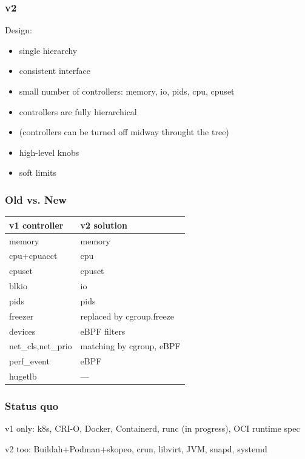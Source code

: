 \documentclass[serif]{beamer}
\begin{document}
\begin{frame}
  \frametitle{v2}

  Design:
  \begin{itemize}
  \item single hierarchy
  \item consistent interface
  \item small number of controllers: memory, io, pids, cpu, cpuset
  \item controllers are fully hierarchical
  \item (controllers can be turned off midway throught the tree)
  \item high-level knobs
  \item soft limits
  \end{itemize}
\end{frame}

\begin{frame}[fragile]
  \frametitle{Old vs. New}

  \begin{tabular}{l|l}
    v1 controller          &  v2 solution\\
    \hline
    memory                 &  memory \\
    cpu+cpuacct            &  cpu    \\
    cpuset                 &  cpuset \\
    blkio                  &  io     \\
    pids                   &  pids   \\[1em]\pause
    freezer                &  replaced by cgroup.freeze\\[1em]\pause
    devices                &  eBPF filters \\[1em]\pause
    net\_cls,net\_prio     &  matching by cgroup, eBPF\\
    perf\_event            &  eBPF\\
    hugetlb                &  —
  \end{tabular}
\end{frame}

\begin{frame}
  \frametitle{Status quo}

  v1 only: k8s, CRI-O, Docker, Containerd, runc (in progress), OCI runtime spec

  \medskip

  v2 too: Buildah+Podman+skopeo, crun, libvirt, JVM, snapd, systemd
\end{frame}
\end{document}
